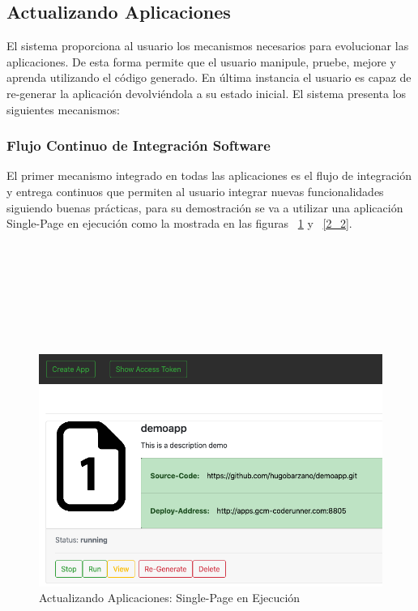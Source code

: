 \documentclass[a4paper,11pt]{book}
\begin{document}
\subsection{Actualizando Aplicaciones}

El sistema proporciona al usuario los mecanismos necesarios para evolucionar las aplicaciones. De esta forma permite que el usuario manipule, pruebe, mejore y aprenda utilizando el código generado. En última instancia el usuario es capaz de re-generar la aplicación devolviéndola a su estado inicial. El sistema presenta los siguientes mecanismos:

\subsubsection{Flujo Continuo de Integración Software}

El primer mecanismo integrado en todas las aplicaciones es el flujo de integración y entrega continuos que permiten al usuario integrar nuevas funcionalidades siguiendo buenas prácticas, para su demostración se va a utilizar una aplicación Single-Page en ejecución como la mostrada en las figuras  ~\ref{2_1}  y  ~\ref{2_2}.
~\\
~\\
~\\
~\\
~\\
~\\
~\\
~\\
\begin{figure}[H]
\centering
\includegraphics[scale=0.45]{imagenes/casouso_a/2_1.png}
\caption{ Actualizando Aplicaciones: Single-Page en Ejecución}
\label{2_1}
\end{figure}
\end{document}
